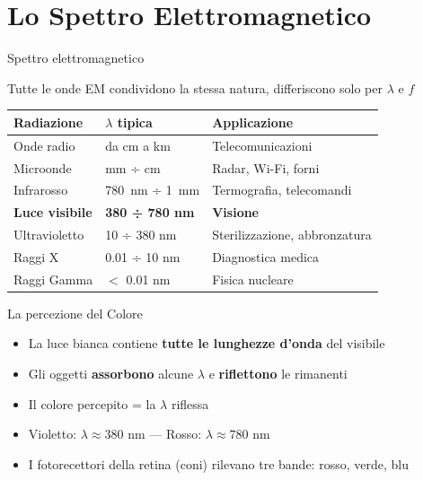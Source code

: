 \section{Lo Spettro Elettromagnetico}


\begin{frame}{Spettro elettromagnetico}

    Tutte le onde EM condividono la stessa natura, differiscono solo per $\lambda$ e $f$
    
    \medskip
    \centering
    
    \renewcommand{\arraystretch}{1.3}
    
    \begin{tabular}{|l|l|l|}
    \hline
    \rowcolor{maincolor!20}
    \textbf{Radiazione} & \textbf{$\lambda$ tipica} & \textbf{Applicazione} \\
    \hline
    Onde radio & da cm a km & Telecomunicazioni \\
    \hline
    Microonde & mm ÷ cm & Radar, Wi-Fi, forni \\
    \hline
    Infrarosso & \SI{780}{nm} ÷ \SI{1}{mm} & Termografia, telecomandi \\
    \hline
    \rowcolor{statalegreen!20}
    \textbf{Luce visibile} & \textbf{380 ÷ 780 nm} & \textbf{Visione} \\
    \hline
    Ultravioletto & 10 ÷ 380 nm & Sterilizzazione, abbronzatura \\
    \hline
    Raggi X & 0.01 ÷ 10 nm & Diagnostica medica \\
    \hline
    Raggi Gamma &  $<$ 0.01 nm & Fisica nucleare \\
    \hline
    \end{tabular}

\end{frame}


\begin{frame}{La percezione del Colore}
    \begin{itemize}
        \item La luce bianca contiene \textbf{tutte le lunghezze d'onda} del visibile
        \item Gli oggetti \textbf{assorbono} alcune $\lambda$ e \textbf{riflettono} le rimanenti
        \item Il colore percepito = la $\lambda$ riflessa
        \item Violetto: $\lambda \approx 380$ nm — Rosso: $\lambda \approx 780$ nm
        \item I fotorecettori della retina (coni) rilevano tre bande: rosso, verde, blu
    \end{itemize}
    
\end{frame}
